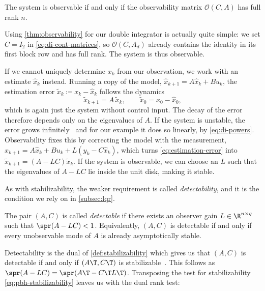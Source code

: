 \begin{theorem}
\label{thm:observability}
The system is observable if and only if the observability matrix
$\mathcal{O}(C, A)$ has full rank $n$.
\end{theorem}

Using \cref{thm:observability} for our double integrator is actually quite simple:
we set $C = I_2$ in \eqref{eq:di-cont-matrices}, so $\mathcal{O}(C, A_d)$
already contains the identity in its first block row and has full rank. The
system is thus observable.

If we cannot uniquely determine $x_k$ from our observation, we work with an
estimate $\hat{x}_k$ instead. Running a copy of the model,
$\hat{x}_{k+1} = A \hat{x}_k + B u_k$, the estimation error
$\tilde{x}_k \coloneqq x_k - \hat{x}_k$ follows the dynamics
\begin{equation}
    \label{eq:estimation-error}
    \tilde{x}_{k+1} = A\, \tilde{x}_k,
    \qquad \tilde{x}_0 = x_0 - \hat{x}_0 ,
\end{equation}
which is again just the system without control input. The decay of the error
therefore depends only on the eigenvalues of $A$.
If the system is unstable, the error grows infinitely~ 
and for our example it does so
linearly, by \eqref{eq:di-powers}. Observability fixes this by correcting
the model with the measurement,
$\hat{x}_{k+1} = A \hat{x}_k + B u_k + L (y_k - C \hat{x}_k)$, which turns
\eqref{eq:estimation-error} into $\tilde{x}_{k+1} = (A - LC) \tilde{x}_k$. If
the system is observable, we can choose an $L$ such that the eigenvalues
of $A - LC$ lie inside the unit disk, making it stable.

As with stabilizability, the weaker requirement is called \emph{detectability}, 
and it is the condition we rely on in \cref{subsec:lqr}. 

\begin{definition}[Detectability]
\label{def:detectability}
The pair $(A, C)$ is called \emph{detectable} if there exists an observer gain
$L \in \R^{n \times q}$ such that $\spr(A - LC) < 1$. Equivalently, $(A,C)$ is
detectable if and only if every unobservable mode of $A$ is already
asymptotically stable.
\end{definition}

Detectability is the dual of \cref{def:stabilizability} which gives us
that $(A, C)$ is detectable if and only if $(A\T, C\T)$ is
stabilizable~. This follows as
$\spr(A - LC) = \spr\!\left(A\T - C\T L\T\right)$. Transposing the test
for stabilizability \eqref{eq:pbh-stabilizability} leaves us with the dual rank test:


